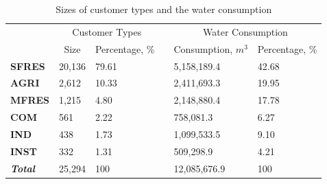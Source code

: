 \documentclass[a4paper,12pt]{llncs}
\begin{document}
\begin{table}[h]
\centering
\caption{Sizes of customer types and the water consumption}
\begin{tabular}{p{2cm}p{2cm}p{2cm}p{2cm}p{2cm}p{2cm}}
\hline
                        & \multicolumn{2}{c}{Customer Types}                            &                      & \multicolumn{2}{c}{Water Consumption}                                    \\ \cline{2-3} \cline{5-6} 
                        & \multicolumn{1}{c}{Size} & \multicolumn{1}{c}{Percentage, \%} & \multicolumn{1}{c}{} & \multicolumn{1}{c}{Consumption, $m^3$} & \multicolumn{1}{c}{Percentage, \%} \\ \hline
\textbf{SFRES}          & 20,136                   & 79.61                              &                      & 5,158,189.4                         & 42.68                              \\
\textbf{AGRI}           & 2,612                    & 10.33                              &                      & 2,411,693.3                         & 19.95                              \\
\textbf{MFRES}          & 1,215                    & 4.80                               &                      & 2,148,880.4                         & 17.78                              \\
\textbf{COM}            & 561                      & 2.22                               &                      & 758,081.3                           & 6.27                               \\
\textbf{IND}            & 438                      & 1.73                               &                      & 1,099,533.5                         & 9.10                               \\
\textbf{INST}           & 332                      & 1.31                               &                      & 509,298.9                           & 4.21                               \\ \hline
\textit{\textbf{Total}} & 25,294                   & 100                                &                      & 12,085,676.9                        & 100                                \\ \hline
\end{tabular}
\label{tab:custgroupandconsump}
\end{table}
\end{document}
